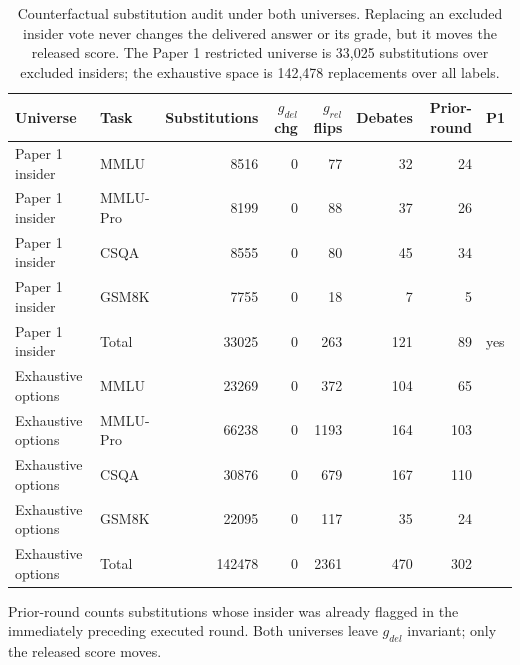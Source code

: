 \begin{table}[htbp]
\centering
\small
\caption{Counterfactual substitution audit under both universes. Replacing an excluded insider vote never changes the delivered answer or its grade, but it moves the released score. The Paper 1 restricted universe is 33,025 substitutions over excluded insiders; the exhaustive space is 142,478 replacements over all labels.}
\label{tab:counterfactual}
\begin{tabular}{llrrrrrl}
\toprule
Universe & Task & Substitutions & $g_{del}$ chg & $g_{rel}$ flips & Debates & Prior-round & P1 \\
\midrule
Paper 1 insider & MMLU & 8516 & 0 & 77 & 32 & 24 &  \\
Paper 1 insider & MMLU-Pro & 8199 & 0 & 88 & 37 & 26 &  \\
Paper 1 insider & CSQA & 8555 & 0 & 80 & 45 & 34 &  \\
Paper 1 insider & GSM8K & 7755 & 0 & 18 & 7 & 5 &  \\
Paper 1 insider & Total & 33025 & 0 & 263 & 121 & 89 & yes \\
\midrule
Exhaustive options & MMLU & 23269 & 0 & 372 & 104 & 65 &  \\
Exhaustive options & MMLU-Pro & 66238 & 0 & 1193 & 164 & 103 &  \\
Exhaustive options & CSQA & 30876 & 0 & 679 & 167 & 110 &  \\
Exhaustive options & GSM8K & 22095 & 0 & 117 & 35 & 24 &  \\
Exhaustive options & Total & 142478 & 0 & 2361 & 470 & 302 &  \\
\bottomrule
\end{tabular}
\par\smallskip\footnotesize Prior-round counts substitutions whose insider was already flagged in the immediately preceding executed round. Both universes leave $g_{del}$ invariant; only the released score moves.
\end{table}
